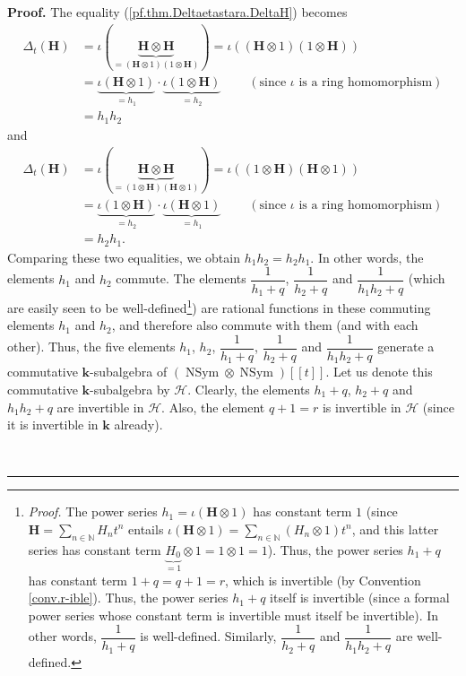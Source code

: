 \documentclass[numbers=enddot,12pt,final,onecolumn,notitlepage]{scrartcl}%
\theoremstyle{definition}
\newenvironment{proof}[1][Proof]{\noindent\textbf{#1.} }{\ \rule{0.5em}{0.5em}}
\let\sumnonlimits\sum
\renewcommand{\sum}{\sumnonlimits\limits}
\begin{document}
\begin{proof}
The equality (\ref{pf.thm.Deltaetastara.DeltaH}) becomes%
\begin{align}
\Delta_{t}\left(  \mathbf{H}\right)   &  =\iota\left(  \underbrace{\mathbf{H}%
\otimes\mathbf{H}}_{=\left(  \mathbf{H}\otimes1\right)  \left(  1\otimes
\mathbf{H}\right)  }\right)  =\iota\left(  \left(  \mathbf{H}\otimes1\right)
\left(  1\otimes\mathbf{H}\right)  \right) \nonumber\\
&  =\underbrace{\iota\left(  \mathbf{H}\otimes1\right)  }_{=h_{1}}%
\cdot\underbrace{\iota\left(  1\otimes\mathbf{H}\right)  }_{=h_{2}%
}\ \ \ \ \ \ \ \ \ \ \left(  \text{since }\iota\text{ is a ring homomorphism}%
\right) \nonumber\\
&  =h_{1}h_{2} \label{pf.thm.Deltaetastara.DeltaH2}%
\end{align}
and
\begin{align*}
\Delta_{t}\left(  \mathbf{H}\right)   &  =\iota\left(  \underbrace{\mathbf{H}%
\otimes\mathbf{H}}_{=\left(  1\otimes\mathbf{H}\right)  \left(  \mathbf{H}%
\otimes1\right)  }\right)  =\iota\left(  \left(  1\otimes\mathbf{H}\right)
\left(  \mathbf{H}\otimes1\right)  \right) \\
&  =\underbrace{\iota\left(  1\otimes\mathbf{H}\right)  }_{=h_{2}}%
\cdot\underbrace{\iota\left(  \mathbf{H}\otimes1\right)  }_{=h_{1}%
}\ \ \ \ \ \ \ \ \ \ \left(  \text{since }\iota\text{ is a ring homomorphism}%
\right) \\
&  =h_{2}h_{1}.
\end{align*}
Comparing these two equalities, we obtain $h_{1}h_{2}=h_{2}h_{1}$. In other
words, the elements $h_{1}$ and $h_{2}$ commute. The elements $\dfrac{1}%
{h_{1}+q}$, $\dfrac{1}{h_{2}+q}$ and $\dfrac{1}{h_{1}h_{2}+q}$ (which are
easily seen to be well-defined\footnote{\textit{Proof.} The power series
$h_{1}=\iota\left(  \mathbf{H}\otimes1\right)  $ has constant term $1$ (since
$\mathbf{H}=\sum_{n\in\mathbb{N}}H_{n}t^{n}$ entails $\iota\left(
\mathbf{H}\otimes1\right)  =\sum_{n\in\mathbb{N}}\left(  H_{n}\otimes1\right)
t^{n}$, and this latter series has constant term $\underbrace{H_{0}}%
_{=1}\otimes1=1\otimes1=1$). Thus, the power series $h_{1}+q$ has constant
term $1+q=q+1=r$, which is invertible (by Convention \ref{conv.r-ible}). Thus,
the power series $h_{1}+q$ itself is invertible (since a formal power series
whose constant term is invertible must itself be invertible). In other words,
$\dfrac{1}{h_{1}+q}$ is well-defined. Similarly, $\dfrac{1}{h_{2}+q}$ and
$\dfrac{1}{h_{1}h_{2}+q}$ are well-defined.}) are rational functions in these
commuting elements $h_{1}$ and $h_{2}$, and therefore also commute with them
(and with each other). Thus, the five elements $h_{1}$, $h_{2}$, $\dfrac
{1}{h_{1}+q}$, $\dfrac{1}{h_{2}+q}$ and $\dfrac{1}{h_{1}h_{2}+q}$ generate a
commutative $\mathbf{k}$-subalgebra of $\left(  \operatorname*{NSym}%
\otimes\operatorname*{NSym}\right)  \left[  \left[  t\right]  \right]  $. Let
us denote this commutative $\mathbf{k}$-subalgebra by $\mathcal{H}$. Clearly,
the elements $h_{1}+q$, $h_{2}+q$ and $h_{1}h_{2}+q$ are invertible in
$\mathcal{H}$. Also, the element $q+1=r$ is invertible in $\mathcal{H}$ (since
it is invertible in $\mathbf{k}$ already).


\end{proof}
\end{document}
